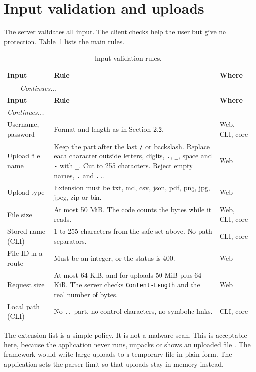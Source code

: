 \section{Input validation and uploads}

The server validates all input. The client checks help the user but give no protection. Table~\ref{tab:validation} lists the main rules.

\begin{longtable}[hp]{|p{3.0cm}|p{7.5cm}|p{2.6cm}|}
	\caption{Input validation rules.}
	\label{tab:validation}\\ \hline
	\textbf{Input} & \textbf{Rule} & \textbf{Where} \\
	\hline
	\endfirsthead
	\multicolumn{3}{l}{\tablename\ \thetable\ -- \textit{Continues...}} \\
	\hline
	\textbf{Input} & \textbf{Rule} & \textbf{Where} \\
	\hline
	\endhead
	\hline \multicolumn{3}{l}{\textit{Continues...}} \\
	\endfoot
	\hline
	\endlastfoot
	Username, password & Format and length as in Section 2.2. & Web, CLI, core \\ \hline
	Upload file name & Keep the part after the last \texttt{/} or backslash. Replace each character outside letters, digits, \texttt{.}, \texttt{\_}, space and \texttt{-} with \texttt{\_}. Cut to 255 characters. Reject empty names, \texttt{.} and \texttt{..}. & Web \\ \hline
	Upload type & Extension must be txt, md, csv, json, pdf, png, jpg, jpeg, zip or bin. & Web \\ \hline
	File size & At most 50 MiB. The code counts the bytes while it reads. & Web, CLI, core \\ \hline
	Stored name (CLI) & 1 to 255 characters from the safe set above. No path separators. & CLI, core \\ \hline
	File ID in a route & Must be an integer, or the status is 400. & Web \\ \hline
	Request size & At most 64 KiB, and for uploads 50 MiB plus 64 KiB. The server checks \texttt{Content-Length} and the real number of bytes. & Web \\ \hline
	Local path (CLI) & No \texttt{..} part, no control characters, no symbolic links. & CLI, core \\ \hline
\end{longtable}

The extension list is a simple policy. It is not a malware scan. This is acceptable here, because the application never runs, unpacks or shows an uploaded file \cite{owaspUpload}. The framework would write large uploads to a temporary file in plain form. The application sets the parser limit so that uploads stay in memory instead.

